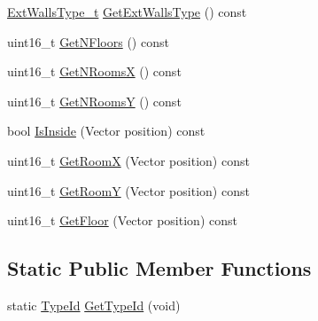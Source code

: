 \begin{DoxyCompactItemize}
\item 
\hyperlink{classns3_1_1Building_a298adc08038580830c70d4cac8fcfefe}{Ext\+Walls\+Type\+\_\+t} \hyperlink{classns3_1_1Building_ab9dd302a55c5af11af9ac72c23d7a2ac}{Get\+Ext\+Walls\+Type} () const 
\item 
uint16\+\_\+t \hyperlink{classns3_1_1Building_a72d2b5dff06b32deef931ed23f9220f6}{Get\+N\+Floors} () const 
\item 
uint16\+\_\+t \hyperlink{classns3_1_1Building_a866a6c68adeb8a2c602aa669cb457a2a}{Get\+N\+RoomsX} () const 
\item 
uint16\+\_\+t \hyperlink{classns3_1_1Building_a3d93ae744bbc1d99bb4c592fbf2db82c}{Get\+N\+RoomsY} () const 
\item 
bool \hyperlink{classns3_1_1Building_aa6fc519b99648c37c829fe52fa91eb8f}{Is\+Inside} (Vector position) const 
\item 
uint16\+\_\+t \hyperlink{classns3_1_1Building_a290594ffd10c9c3662d5dec1d82a6789}{Get\+RoomX} (Vector position) const 
\item 
uint16\+\_\+t \hyperlink{classns3_1_1Building_a724b2bd14b0b976779b596c07681838b}{Get\+RoomY} (Vector position) const 
\item 
uint16\+\_\+t \hyperlink{classns3_1_1Building_a8f2ba09a85cccadd6b9efe5069d48888}{Get\+Floor} (Vector position) const 
\end{DoxyCompactItemize}
\subsection*{Static Public Member Functions}
\begin{DoxyCompactItemize}
\item 
static \hyperlink{classns3_1_1TypeId}{Type\+Id} \hyperlink{classns3_1_1Building_ad8d823ade148dd17d8767427d1986d02}{Get\+Type\+Id} (void)
\end{DoxyCompactItemize}
